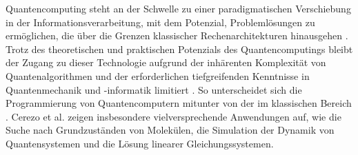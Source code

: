 
Quantencomputing steht an der Schwelle zu einer paradigmatischen
Verschiebung in der Informationsverarbeitung, mit dem Potenzial,
Problemlösungen zu ermöglichen, die über die Grenzen klassischer
Rechenarchitekturen hinausgehen \cite{Shor1999}. Trotz des theoretischen und
praktischen Potenzials des Quantencomputings bleibt der Zugang zu dieser
Technologie aufgrund der inhärenten Komplexität von Quantenalgorithmen
und der erforderlichen tiefgreifenden Kenntnisse in Quantenmechanik und
-informatik limitiert \cite{Chitransh2022}. So unterscheidet sich die Programmierung
von Quantencomputern mitunter von der im klassischen Bereich \cite{Rieffel2011}. 
Cerezo et al. \cite{Cerezo2021} zeigen insbesondere vielversprechende Anwendungen auf, wie die Suche nach
Grundzuständen von Molekülen, die Simulation der Dynamik von
Quantensystemen und die Lösung linearer Gleichungssystemen. 

